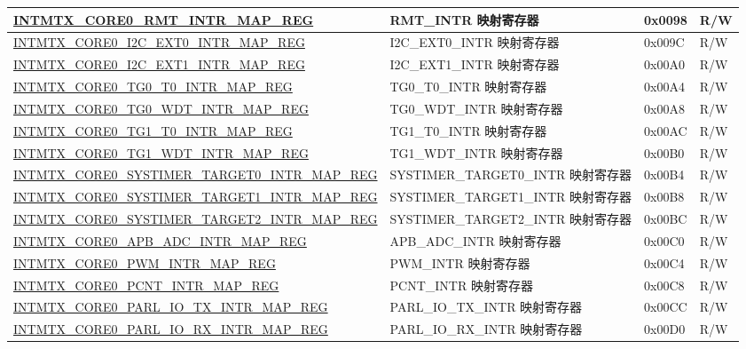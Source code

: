 \begin{longtable}{ | p{10cm} | m{10cm} | m{1.3cm} | m{1.0cm} | }
\hyperref[regdesc:INTMTXCORE0RMTINTRMAPREG]{INTMTX\_CORE0\_RMT\_INTR\_MAP\_REG} & RMT\_INTR 映射寄存器 & 0x0098 & R/W \\ \hline
\hyperref[regdesc:INTMTXCORE0I2CEXT0INTRMAPREG]{INTMTX\_CORE0\_I2C\_EXT0\_INTR\_MAP\_REG} & I2C\_EXT0\_INTR 映射寄存器 & 0x009C & R/W \\ \hline
\hyperref[regdesc:INTMTXCORE0I2CEXT1INTRMAPREG]{INTMTX\_CORE0\_I2C\_EXT1\_INTR\_MAP\_REG} & I2C\_EXT1\_INTR 映射寄存器 & 0x00A0 & R/W \\ \hline
\hyperref[regdesc:INTMTXCORE0TG0T0INTRMAPREG]{INTMTX\_CORE0\_TG0\_T0\_INTR\_MAP\_REG} & TG0\_T0\_INTR 映射寄存器 & 0x00A4 & R/W \\ \hline
\hyperref[regdesc:INTMTXCORE0TG0WDTINTRMAPREG]{INTMTX\_CORE0\_TG0\_WDT\_INTR\_MAP\_REG} & TG0\_WDT\_INTR 映射寄存器 & 0x00A8 & R/W \\ \hline
\hyperref[regdesc:INTMTXCORE0TG1T0INTRMAPREG]{INTMTX\_CORE0\_TG1\_T0\_INTR\_MAP\_REG} & TG1\_T0\_INTR 映射寄存器 & 0x00AC & R/W \\ \hline
\hyperref[regdesc:INTMTXCORE0TG1WDTINTRMAPREG]{INTMTX\_CORE0\_TG1\_WDT\_INTR\_MAP\_REG} & TG1\_WDT\_INTR 映射寄存器 & 0x00B0 & R/W \\ \hline
\hyperref[regdesc:INTMTXCORE0SYSTIMERTARGET0INTRMAPREG]{INTMTX\_CORE0\_SYSTIMER\_TARGET0\_INTR\_MAP\_REG} & SYSTIMER\_TARGET0\_INTR 映射寄存器 & 0x00B4 & R/W \\ \hline
\hyperref[regdesc:INTMTXCORE0SYSTIMERTARGET1INTRMAPREG]{INTMTX\_CORE0\_SYSTIMER\_TARGET1\_INTR\_MAP\_REG} & SYSTIMER\_TARGET1\_INTR 映射寄存器 & 0x00B8 & R/W \\ \hline
\hyperref[regdesc:INTMTXCORE0SYSTIMERTARGET2INTRMAPREG]{INTMTX\_CORE0\_SYSTIMER\_TARGET2\_INTR\_MAP\_REG} & SYSTIMER\_TARGET2\_INTR 映射寄存器 & 0x00BC & R/W \\ \hline
\hyperref[regdesc:INTMTXCORE0APBADCINTRMAPREG]{INTMTX\_CORE0\_APB\_ADC\_INTR\_MAP\_REG} & APB\_ADC\_INTR 映射寄存器 & 0x00C0 & R/W \\ \hline
\hyperref[regdesc:INTMTXCORE0PWMINTRMAPREG]{INTMTX\_CORE0\_PWM\_INTR\_MAP\_REG} & PWM\_INTR 映射寄存器 & 0x00C4 & R/W \\ \hline
\hyperref[regdesc:INTMTXCORE0PCNTINTRMAPREG]{INTMTX\_CORE0\_PCNT\_INTR\_MAP\_REG} & PCNT\_INTR 映射寄存器 & 0x00C8 & R/W \\ \hline
\hyperref[regdesc:INTMTXCORE0PARLIOTXINTRMAPREG]{INTMTX\_CORE0\_PARL\_IO\_TX\_INTR\_MAP\_REG} & PARL\_IO\_TX\_INTR 映射寄存器 & 0x00CC & R/W \\ \hline
\hyperref[regdesc:INTMTXCORE0PARLIORXINTRMAPREG]{INTMTX\_CORE0\_PARL\_IO\_RX\_INTR\_MAP\_REG} & PARL\_IO\_RX\_INTR 映射寄存器 & 0x00D0 & R/W \\ \hline

\end{longtable}
